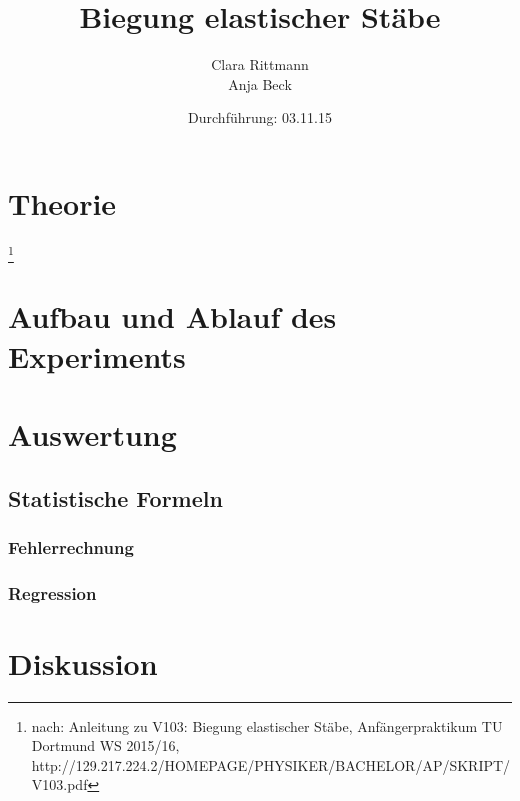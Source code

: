 \documentclass[a4,12pt]{article}
\title{Biegung elastischer Stäbe}
\author{Clara Rittmann \\ Anja Beck}
\date{Durchführung: 03.11.15}
\begin{document}
	\maketitle
	\date{}
\newpage
	\tableofcontents
\newpage

	\section{Theorie}\footnote{nach: Anleitung zu V103: Biegung elastischer Stäbe, Anfängerpraktikum TU Dortmund WS 2015/16, http://129.217.224.2/HOMEPAGE/PHYSIKER/BACHELOR/AP/SKRIPT/V103.pdf}
	
\newpage

	\section{Aufbau und Ablauf des Experiments}
	
\newpage

	\section{Auswertung}
	\subsection{Statistische Formeln}
	\subsubsection{Fehlerrechnung}
	
	\subsubsection{Regression}
	\label{sec:regression}
	
	
\newpage

	\section{Diskussion}
	
\end{document}
